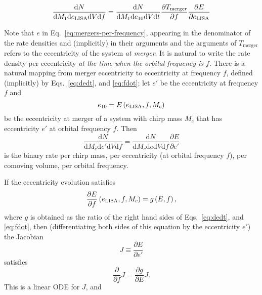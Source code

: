 \documentclass[twocolumn]{aastex631}
\newcommand{\dd}{\mathrm{d}}
\newcommand{\diff}[2]{\frac{\dd #1}{\dd #2}}
\begin{document}
\begin{equation}
    \label{eq:mergers-per-frequency}
    \diff{N}{M_1 \dd e_{\rm LISA} \dd V \dd f} = \diff{N}{M_1 \dd e_{10} \dd V \dd t} \frac{\partial T_\mathrm{merger}}{\partial f} \frac{\partial E}{\partial e_{\rm LISA}}
\end{equation}

Note that $e$ in Eq.\ \eqref{eq:mergers-per-frequency}, appearing in the
denominator of the rate densities and (implicitly) in their arguments and the
arguments of $T_\mathrm{merger}$ refers to the eccentricity of the system
\emph{at merger}.  It is natural to write the rate density per eccentricity
\emph{at the time when the orbital frequency is $f$}.  There is a natural
mapping from merger eccentricity to eccentricity at frequency $f$, defined
(implicitly) by Eqs.\ \eqref{eq:dedt}, and \eqref{eq:fdot}; let
$e'$ be the eccentricity at frequency $f$ and 
\begin{equation}
    e_{10} = E\left( e_{\rm LISA}, f, M_c \right)
\end{equation}
be the eccentricity at merger of a system with chirp mass $M_c$ that has
eccentricity $e'$ at orbital frequency $f$.  Then 
\begin{equation}
    \diff{N}{M_c \dd e' \dd V \dd f} = \diff{N}{M_c \dd e \dd V \dd f} \frac{\partial E}{\partial e'}
\end{equation}
is the binary rate per chirp mass, per eccentricity (at orbital frequency $f$),
per comoving volume, per orbital frequency.  

If the eccentricity evolution satisfies 
\begin{equation}
    \frac{\partial E}{\partial f}\left( e_{\rm LISA}, f, M_c \right) = g\left( E, f \right),
\end{equation}
where $g$ is obtained as the ratio of the right hand sides of Eqs.\
\eqref{eq:dedt}, and \eqref{eq:fdot}, then (differentiating both sides of this
equation by the eccentricity $e'$) the Jacobian 
\begin{equation}
    J \equiv \frac{\partial E}{\partial e'}
\end{equation}
satisfies 
\begin{equation}
    \frac{\partial}{\partial f} J = \frac{\partial g}{\partial E} J.
\end{equation}
This is a linear ODE for $J$, and 


\end{document}
